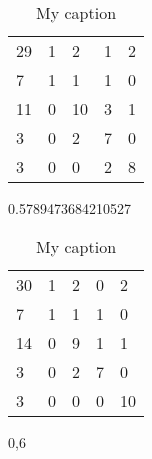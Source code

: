 \documentclass[12pt]{article}
\begin{document}
\begin{table}[]
\centering
\caption{My caption}
\label{my-label}
\begin{tabular}{lllll}
29 & 1 & 2  & 1 & 2 \\
7  & 1 & 1  & 1 & 0 \\
11 & 0 & 10 & 3 & 1 \\
3  & 0 & 2  & 7 & 0 \\
3  & 0 & 0  & 2 & 8
\end{tabular}
\end{table}
0.5789473684210527




\begin{table}[]
\centering
\caption{My caption}
\label{my-label}
\begin{tabular}{lllll}
30 & 1 & 2 & 0 & 2  \\
7  & 1 & 1 & 1 & 0  \\
14 & 0 & 9 & 1 & 1  \\
3  & 0 & 2 & 7 & 0  \\
3  & 0 & 0 & 0 & 10
\end{tabular}
\end{table}
0,6
\end{document}
